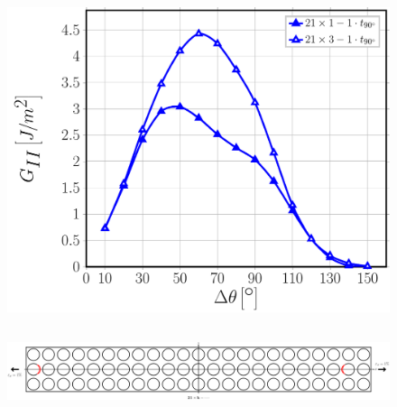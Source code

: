 \documentclass[first,firstsupp,lastsupp,last,hyperref,table]{ETHclass}
\begin{document}
\begin{frame}
\begin{columns}[c]
\begin{column}{0.5\textwidth}
\begin{figure}
\includegraphics[width=\columnwidth]{nxk-1-vf60-GII-crackshield21.pdf}
\end{figure}
\end{column}
\end{columns}
\begin{figure}
\centering
\includegraphics[width=\textwidth]{twofibers-sameside-crackshielding21.pdf}
\end{figure}
\end{frame}

\addtocounter{framenumber}{-1}
\end{document}
